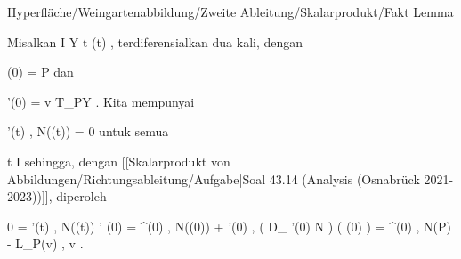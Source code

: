 {Hyperfläche/Weingartenabbildung/Zweite Ableitung/Skalarprodukt/Fakt}
{Lemma}
{}
{

\faktzusatz {}
\faktzusatz {}

}
{

Misalkan
\maabbeledisp {\gamma} { I } { Y
} { t } { \gamma(t)
} {,}
terdiferensialkan dua kali, dengan

\mavergleichskette
{\vergleichskette
{ \gamma(0)
}
{ = }{ P
}
{  }{
}
{    }{
}
{   }{
}
}
{}{}{}
dan

\mavergleichskette
{\vergleichskette
{ \gamma'(0)
}
{ = }{ v
}
{ \in }{ T_PY
}
{    }{
}
{   }{
}
}
{}{}{.}
Kita mempunyai

\mavergleichskettedisp
{\vergleichskette
{ \left\langle  \gamma'(t)  ,  N(\gamma(t))   \right\rangle
}
{ =} { 0
}
{ } {
}
{ } {
}
{ } {
}
}
{}{}{}
untuk semua

\mavergleichskette
{\vergleichskette
{ t
}
{ \in }{ I
}
{  }{
}
{    }{
}
{   }{
}
}
{}{}{}
sehingga, dengan
[[Skalarprodukt von Abbildungen/Richtungsableitung/Aufgabe|Soal 43.14 (Analysis (Osnabrück 2021-2023))]], diperoleh

\mavergleichskettealign
{\vergleichskettealign
{ 0
}
{ =} { \left\langle  \gamma'(t)  ,  N(\gamma(t))   \right\rangle' (0)
}
{ =} { \left\langle  \gamma^{\prime \prime}(0)  ,  N(\gamma(0))  \right\rangle + \left\langle  \gamma'(0)  ,  \left(  D_{ \gamma'(0) }  N   \right) \left(   \gamma(0)   \right)   \right\rangle
}
{ =} { \left\langle  \gamma^{\prime \prime}(0) , N(P)  \right\rangle - \left\langle  L_P(v)  ,  v   \right\rangle
}
{ } {
}
}
{}
{}{.}

}

